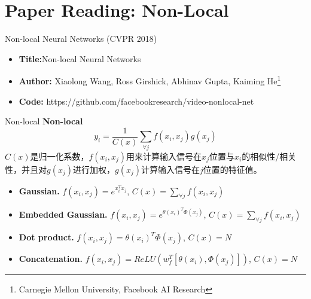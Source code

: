 \section{Paper Reading: Non-Local}


\begin{frame}{Non-local Neural Networks (CVPR 2018)\cite{NonLocal2018}}
    \begin{itemize}
        \item \textbf{Title:}Non-local Neural Networks
        \item \textbf{Author:} Xiaolong Wang, Ross Girshick, Abhinav Gupta, Kaiming He\footnote{Carnegie Mellon University, Facebook AI Research}
        \item \textbf{Code:} https://github.com/facebookresearch/video-nonlocal-net
    \end{itemize}
\end{frame}


\begin{frame}{Non-local}
    \textbf{Non-local}
    \begin{equation}
        y_i=\frac{1}{C(x)}\sum_{\forall j}f(x_i,x_j)g(x_j)
    \end{equation}
    $C(x)$是归一化系数，$f(x_i,x_j)$用来计算输入信号在$x_j$位置与$x_i$的相似性/相关性，并且对$g(x_j)$进行加权，$g(x_j)$计算输入信号在$j$位置的特征值。
    \begin{itemize}
        \item \textbf{Gaussian.} $f(x_i,x_j)=e^{x_i^T x_j}$, $C(x)=\sum_{\forall j}f(x_i,x_j)$
        \item \textbf{Embedded Gaussian.} $f(x_i,x_j)=e^{\theta(x_i)^T \Phi(x_j)}$, $C(x)=\sum_{\forall j}f(x_i,x_j)$
        \item \textbf{Dot product.} $f(x_i,x_j)=\theta(x_i)^T \Phi(x_j)$, $C(x)=N$
        \item \textbf{Concatenation.} $f(x_i,x_j)=ReLU(w_f^T [\theta(x_i),\Phi(x_j)])$, $C(x)=N$
    \end{itemize}
\end{frame}

